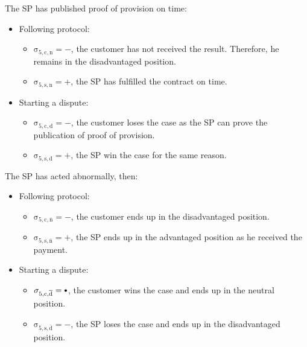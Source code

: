 \documentclass{ieeeaccess}
\newcommand\sbullet[1][.75]{\mathbin{\ThisStyle{\vcenter{\hbox{%
  \scalebox{#1}{$\SavedStyle\bullet$}}}}}%
}
\begin{document}
The SP has published proof of provision on time:

\begin{itemize}
\item
  Following protocol:

  \begin{itemize}
  
  \item
    \(\operatorname{\sigma_{5, c, n} = -}\), the customer has not received the result. Therefore, he remains in the disadvantaged position. 
  \item
    \(\operatorname{\sigma_{5, s, n} = +}\), the SP has fulfilled the contract on time.
  \end{itemize}
\item
  Starting a dispute:

  \begin{itemize}
  
  \item
    \(\operatorname{\sigma_{5, c, d} = -}\), the customer loses the case as the SP can prove the publication of proof of provision. 
  \item
    \(\operatorname{\sigma_{5, s, d} = +}\), the SP win the case for the same reason.
  \end{itemize}
\end{itemize}

The SP has acted abnormally, then:

\begin{itemize}
\item
  Following protocol:

  \begin{itemize}
  
  \item
    \(\operatorname{\sigma_{5, c, \overline{n}} = -}\), the customer ends up in the disadvantaged position.
  \item
    \(\operatorname{\sigma_{5, s, \overline{n}} = +}\), the SP ends up in the advantaged position as he received the payment.
  \end{itemize}
\item
  Starting a dispute:

  \begin{itemize}
  
  \item
    \(\operatorname{\sigma_{5, c, \overline{d}} = \sbullet}\), the customer wins the case and ends up in the neutral position. 
  \item
    \(\operatorname{\sigma_{5, s, \overline{d}} = -}\), the SP loses the case and ends up in the disadvantaged position. 
  \end{itemize}
\end{itemize}
\end{document}
